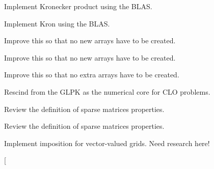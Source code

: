 
\begin{DoxyRefList}
\item[\label{todo__todo000001}%
\hypertarget{todo__todo000001}{}%
Member \hyperlink{classmtk_1_1DenseMatrix_a01d3d8bd502870f93bf3a88a0cc5fb49}{mtk\+:\+:Dense\+Matrix\+:\+:Kron} (const Dense\+Matrix \&aa, const Dense\+Matrix \&bb)]Implement Kronecker product using the B\+L\+A\+S. 

Implement Kron using the B\+L\+A\+S.  
\item[\label{todo__todo000020}%
\hypertarget{todo__todo000020}{}%
Member \hyperlink{classmtk_1_1DenseMatrix_a59b9bea24acf39dca64e8549b3527463}{mtk\+:\+:Dense\+Matrix\+:\+:Order\+Col\+Major} ()]Improve this so that no new arrays have to be created.  
\item[\label{todo__todo000019}%
\hypertarget{todo__todo000019}{}%
Member \hyperlink{classmtk_1_1DenseMatrix_ac2949efba3e8278335d45418c85433e4}{mtk\+:\+:Dense\+Matrix\+:\+:Order\+Row\+Major} ()]Improve this so that no new arrays have to be created.  
\item[\label{todo__todo000018}%
\hypertarget{todo__todo000018}{}%
Member \hyperlink{classmtk_1_1DenseMatrix_a71d9c07ca66e88d97d1fd5012f43138b}{mtk\+:\+:Dense\+Matrix\+:\+:Transpose} ()]Improve this so that no extra arrays have to be created.  
\item[\label{todo__todo000002}%
\hypertarget{todo__todo000002}{}%
Class \hyperlink{classmtk_1_1GLPKAdapter}{mtk\+:\+:G\+L\+P\+K\+Adapter} ]Rescind from the G\+L\+P\+K as the numerical core for C\+L\+O problems.  
\item[\label{todo__todo000028}%
\hypertarget{todo__todo000028}{}%
Member \hyperlink{classmtk_1_1Matrix_af4bba5c43d1f09f5059a04298ba24568}{mtk\+:\+:Matrix\+:\+:Increase\+Num\+Null} () noexcept]Review the definition of sparse matrices properties.  
\item[\label{todo__todo000027}%
\hypertarget{todo__todo000027}{}%
Member \hyperlink{classmtk_1_1Matrix_ace7cb5c31d0de66b8f9c63cd542c9e63}{mtk\+:\+:Matrix\+:\+:Increase\+Num\+Zero} () noexcept]Review the definition of sparse matrices properties.  
\item[\label{todo__todo000031}%
\hypertarget{todo__todo000031}{}%
Member \hyperlink{classmtk_1_1RobinBCDescriptor2D_ac9564bc46c196cbf4720a0e4b93da8b0}{mtk\+:\+:Robin\+B\+C\+Descriptor2\+D\+:\+:Impose\+On\+Grid} (Uni\+Stg\+Grid2\+D \&grid, const Real \&time=k\+Zero) const ]Implement imposition for vector-\/valued grids. Need research here!  
\item[\label{todo__todo000029}%

\end{DoxyRefList}
